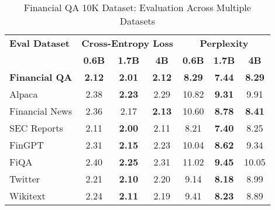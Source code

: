 
\begin{table}[h]
\centering
\caption[Financial QA 10K: Evaluation Results]{Financial QA 10K Dataset: Evaluation Across Multiple Datasets}
\label{tab:financial_qa_results}
\begin{tabular}{l|ccc|ccc}
\hline
\textbf{Eval Dataset} & \multicolumn{3}{c|}{\textbf{Cross-Entropy Loss}} & \multicolumn{3}{c}{\textbf{Perplexity}} \\
\cline{2-4} \cline{5-7}
  & \textbf{0.6B} & \textbf{1.7B} & \textbf{4B} & \textbf{0.6B} & \textbf{1.7B} & \textbf{4B} \\
\textbf{Financial QA} & \textbf{2.12} & \textbf{2.01} & \textbf{2.12} & \textbf{8.29} & \textbf{7.44} & \textbf{8.29} \\
Alpaca & 2.38 & \textbf{2.23} & 2.29 & 10.82 & \textbf{9.31} & 9.91 \\
Financial News & 2.36 & 2.17 & \textbf{2.13} & 10.60 & \textbf{8.78} & \textbf{8.41} \\
SEC Reports & 2.11 & \textbf{2.00} & 2.11 & 8.21 & \textbf{7.40} & 8.25 \\
FinGPT & 2.31 & \textbf{2.15} & 2.23 & 10.04 & \textbf{8.62} & 9.34 \\
FiQA & 2.40 & \textbf{2.25} & 2.31 & 11.02 & \textbf{9.45} & 10.05 \\
Twitter & 2.21 & \textbf{2.10} & 2.20 & 9.14 & \textbf{8.18} & 8.99 \\
Wikitext & 2.24 & \textbf{2.11} & 2.19 & 9.41 & \textbf{8.23} & 8.89 \\
\hline
\end{tabular}
\end{table}
